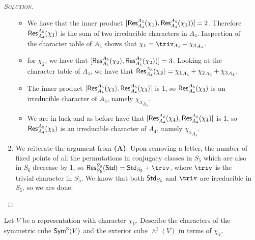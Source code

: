 \begin{proof}[{\scshape Solution}]
\begin{enumerate}[font=\normalfont,label=\textbf{(\Alph*)}, wide]
\begin{itemize}
        \item We have that the inner product $[\mathsf{Res}^{A_5}_{A_4}(\chi_1), \mathsf{Res}^{A_5}_{A_4}(\chi_1))] = 2$. Therefore $\mathsf{Res}^{A_5}_{A_4}(\chi_1)$ is the sum of two irreducible characters in $A_4$. Inspection of the character table of $A_4$ shows that $\chi_1 = \triv_{A_4} + {\chi_3}_{A_4}$.

        \item for $\chi_2$, we have that $[\mathsf{Res}^{A_5}_{A_4}(\chi_2), \mathsf{Res}^{A_5}_{A_4}(\chi_2))] = 3$. Looking at the character table of $A_4$, we have that $\mathsf{Res}^{A_5}_{A_4}(\chi_2) = {\chi_1}_{A_4} + {\chi_2}_{A_4} +  {\chi_3}_{A_4}$.

        \item The inner product $[\mathsf{Res}^{A_5}_{A_4}(\chi_3), \mathsf{Res}^{A_5}_{A_4}(\chi_3)]$ is 1, so $\mathsf{Res}^{A_5}_{A_4}(\chi_3)$ is an irreducible character of $A_4$, namely ${\chi_3}_{A_4}$.

        \item We are in luck and as before have that $[\mathsf{Res}^{A_5}_{A_4}(\chi_4), \mathsf{Res}^{A_5}_{A_4}(\chi_4)]$ is 1, so $\mathsf{Res}^{A_5}_{A_4}(\chi_3)$ is an irreducible character of $A_4$, namely ${\chi_3}_{A_4}$.
      \end{itemize}

    \item We reiterate the argument from \textbf{(A)}: Upon removing a letter, the number of fixed points of all the permutations in conjugacy classes in $S_5$ which are also in $S_6$ decrease by 1, so $\Res^{S_6}_{S_5}(\Std) = \Std_{S_5} + \triv$, where $\triv$ is the trivial character in $S_5$. We know that both $\mathsf{Std}_{S_5}$ and $\triv$ are irreducible in $S_5$, so we are done.

  \end{enumerate}
\end{proof}

\newpage

\begin{problem}
Let $V$ be a representation with character $\chi_V$. Describe the characters of the symmetric cube $\mathsf{Sym}^3(V)$ and the exterior cube $\wedge^3(V)$ in terms of $\chi_V$.
\end{problem}


